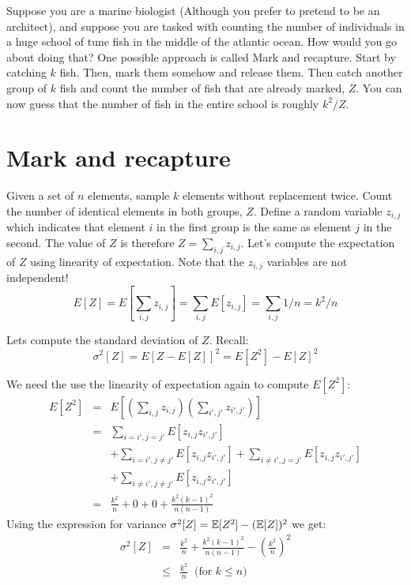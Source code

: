 \documentclass{article}
\begin{document}


Suppose you are a marine biologist (Although you prefer to pretend to be an architect), and
suppose you are tasked with counting the number of individuals in a huge school of tune fish in 
the middle of the atlantic ocean. How would you go about doing that? 
One possible approach is called Mark and recapture.
Start by catching $k$ fish. Then, mark them somehow 
and release them. Then catch another group of $k$ fish and count the number of fish that are already marked, $Z$.
You can now guess that the number of fish in the entire school is roughly $k^2/Z$.

\section*{Mark and recapture}
Given a set of $n$ elements, sample $k$ elements without replacement twice.
Count the number of identical elements in both groups, $Z$.
Define a random variable $z_{i,j}$ which indicates that
element $i$ in the first group is the same as element $j$ in the second.
The value of $Z$ is therefore $Z = \sum_{i,j} z_{i,j}$.
Let's compute the expectation of $Z$ using linearity of expectation.
Note that the $z_{i,j}$ variables are not independent!
\begin{equation}
E[Z] = E[\sum_{i,j} z_{i,j}] = \sum_{i,j} E [z_{i,j}] = \sum_{i,j} 1/n = k^2/n
\end{equation}

\noindent Lets compute the standard deviation of $Z$. Recall:
$$\sigma^2[Z]  = E[Z-E[Z]]^2= E[Z^2] - E[Z]^2$$

\noindent  We need the use the linearity of expectation again to compute $E[Z^2]$:
\begin{eqnarray}
E[Z^2] &=& E[(\sum_{i,j} z_{i,j})(\sum_{i',j'} z_{i',j'})] \\ 
&=& \sum_{i=i',j=j'} E[z_{i,j}z_{i',j'}] \\
& & + \sum_{i=i', j \ne j'} E[z_{i,j}z_{i',j'}] +\sum_{i \ne i', j = j'} E[z_{i,j}z_{i',j'}]  \\
& & + \sum_{i \ne i', j \ne j'} E[z_{i,j}z_{i',j'}] \\
& = & \frac{k^2}{n} + 0 + 0 + \frac{k^2(k-1)^2}{n(n-1)} 
\end{eqnarray}
Using the expression for variance $\sigma^2[Z] = {\mathbb E}[Z^2] - ({\mathbb E}[Z])^2$ we get:
\begin{eqnarray}
\sigma^2[Z] &=& \frac{k^2}{n} + \frac{k^2(k-1)^2}{n(n-1)} - \left(\frac{k^2}{n}\right)^2 \\
&\le& \frac{k^2}{n}   \;\;\mbox{(for $k \le n$)}
\end{eqnarray}
\end{document}
